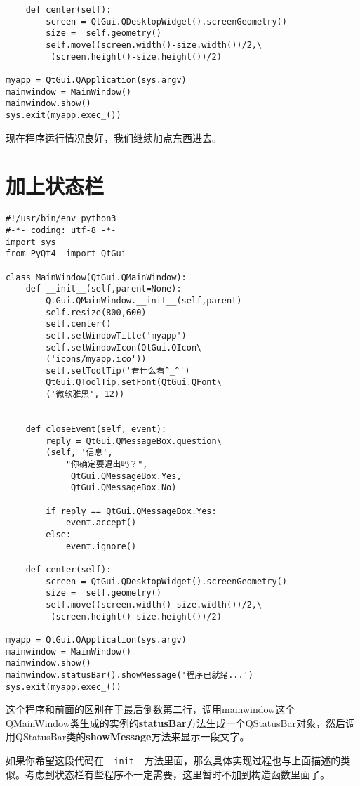 \documentclass[12pt,oneside]{book}
\begin{document}
\begin{common-format}
\begin{Verbatim}
    def center(self):
        screen = QtGui.QDesktopWidget().screenGeometry()
        size =  self.geometry()
        self.move((screen.width()-size.width())/2,\
         (screen.height()-size.height())/2)

myapp = QtGui.QApplication(sys.argv)
mainwindow = MainWindow()
mainwindow.show()
sys.exit(myapp.exec_())
\end{Verbatim}

现在程序运行情况良好，我们继续加点东西进去。


\section{加上状态栏}
\begin{Verbatim}
#!/usr/bin/env python3
#-*- coding: utf-8 -*-
import sys
from PyQt4  import QtGui

class MainWindow(QtGui.QMainWindow):
    def __init__(self,parent=None):
        QtGui.QMainWindow.__init__(self,parent)
        self.resize(800,600)
        self.center()
        self.setWindowTitle('myapp')
        self.setWindowIcon(QtGui.QIcon\
        ('icons/myapp.ico'))
        self.setToolTip('看什么看^_^')
        QtGui.QToolTip.setFont(QtGui.QFont\
        ('微软雅黑', 12))


    def closeEvent(self, event):
        reply = QtGui.QMessageBox.question\
        (self, '信息',
            "你确定要退出吗？",
             QtGui.QMessageBox.Yes,
             QtGui.QMessageBox.No)

        if reply == QtGui.QMessageBox.Yes:
            event.accept()
        else:
            event.ignore()

    def center(self):
        screen = QtGui.QDesktopWidget().screenGeometry()
        size =  self.geometry()
        self.move((screen.width()-size.width())/2,\
         (screen.height()-size.height())/2)

myapp = QtGui.QApplication(sys.argv)
mainwindow = MainWindow()
mainwindow.show()
mainwindow.statusBar().showMessage('程序已就绪...')
sys.exit(myapp.exec_())
\end{Verbatim}

这个程序和前面的区别在于最后倒数第二行，调用mainwindow这个QMainWindow类生成的实例的\textbf{statusBar}方法生成一个QStatusBar对象，然后调用QStatusBar类的\textbf{showMessage}方法来显示一段文字。

如果你希望这段代码在\verb+__init__+方法里面，那么具体实现过程也与上面描述的类似。考虑到状态栏有些程序不一定需要，这里暂时不加到构造函数里面了。



\end{common-format}
\end{document}
